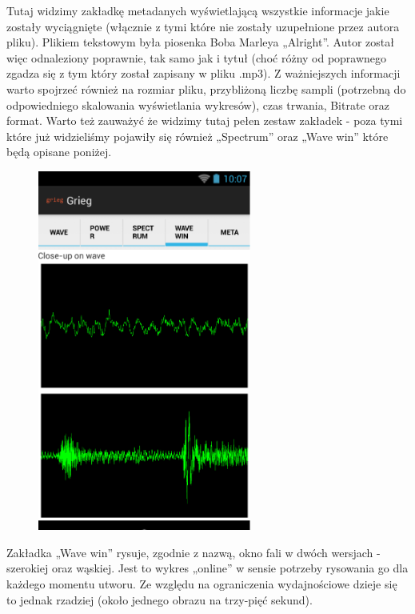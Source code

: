 Tutaj widzimy zakładkę metadanych wyświetlającą wszystkie informacje jakie zostały wyciągnięte
(włącznie z tymi które nie zostały uzupełnione przez autora pliku). Plikiem tekstowym była piosenka
Boba Marleya „Alright”. Autor został więc odnaleziony poprawnie, tak samo jak i tytuł (choć różny od
poprawnego zgadza się z tym który został zapisany w pliku .mp3). Z ważniejszych informacji warto
spojrzeć również na rozmiar pliku, przybliżoną liczbę sampli (potrzebną do odpowiedniego skalowania
wyświetlania wykresów), czas trwania, Bitrate oraz format.  Warto też zauważyć że widzimy tutaj
pełen zestaw zakładek - poza tymi które już widzieliśmy pojawiły się również „Spectrum” oraz „Wave
win” które będą opisane poniżej.

\begin{figure}[H]
  \centering
  \includegraphics[width=7cm]{images/full_wave_window}
\end{figure}

Zakładka „Wave win” rysuje, zgodnie z nazwą, okno fali w dwóch wersjach - szerokiej oraz wąskiej.
Jest to wykres „online” w sensie potrzeby rysowania go dla każdego momentu utworu. Ze względu na
ograniczenia wydajnościowe dzieje się to jednak rzadziej (około jednego obrazu na trzy-pięć sekund).

